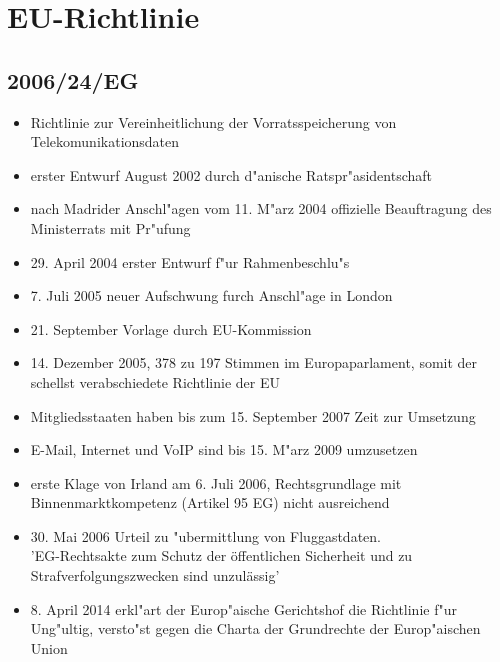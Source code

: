 
\section{EU-Richtlinie}
  \subsection{2006/24/EG}
    \begin{frame}
      \begin{itemize}
        \item
          Richtlinie zur Vereinheitlichung der Vorratsspeicherung von Telekomunikationsdaten
        \item
          erster Entwurf August 2002 durch d"anische Ratspr"asidentschaft
        \item
          nach Madrider Anschl"agen vom 11. M"arz 2004 offizielle Beauftragung des Ministerrats mit Pr"ufung
        \item
          29. April 2004 erster Entwurf f"ur Rahmenbeschlu"s
        \item 
          7. Juli 2005 neuer Aufschwung furch Anschl"age in London
        \item
          21. September Vorlage durch EU-Kommission
        \item
          14. Dezember 2005, 378 zu 197 Stimmen im Europaparlament, somit der schellst verabschiedete Richtlinie der EU


      \end{itemize}
    \end{frame}

    \begin{frame}
      \begin{itemize}
        \item 
          Mitgliedsstaaten haben bis zum 15. September 2007 Zeit zur Umsetzung
        \item 
          E-Mail, Internet und VoIP sind bis 15. M"arz 2009 umzusetzen
        \item
          erste Klage von Irland am 6. Juli 2006, Rechtsgrundlage mit Binnenmarktkompetenz (Artikel 95 EG) nicht ausreichend
        \item
          30. Mai 2006 Urteil zu "ubermittlung von Fluggastdaten.\\
          'EG-Rechtsakte zum Schutz der öffentlichen Sicherheit und zu Strafverfolgungszwecken sind unzulässig'
        \item 
          8. April 2014 erkl"art der Europ"aische Gerichtshof die Richtlinie f"ur Ung"ultig, versto"st gegen die Charta der Grundrechte der Europ"aischen Union
      \end{itemize}
    \end{frame}

